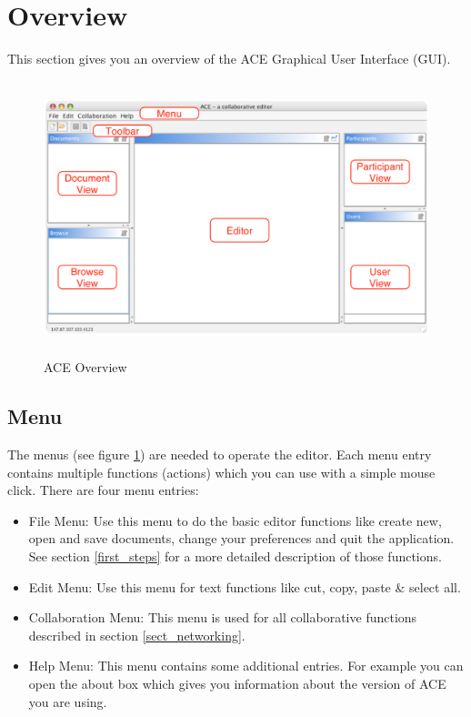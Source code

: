 \documentclass[11pt,a4paper]{article}
\begin{document}
\newpage
\section{Overview}
This section gives you an overview of the ACE Graphical User Interface (GUI). 

\begin{figure}[H]
\begin{center}
  \includegraphics[height=3.135in, width=5.01in]{../images/usermanual/g_ace_overview.eps}
\caption{ACE Overview}
\label{ace_overview}
\end{center}
\end{figure}

\subsection{Menu}
The menus (see figure \ref{ace_overview}) are needed to operate the editor. Each menu entry contains multiple functions (actions) which you can use with a simple mouse click. There are four menu entries:
\begin{itemize}
\item File Menu: Use this menu to do the basic editor functions like create new, open and save documents, change your preferences and quit the application. See section \ref{first_steps} for a more detailed description of those functions.
\item Edit Menu: Use this menu for text functions like cut, copy, paste \& select all.
\item Collaboration Menu: This menu is used for all collaborative functions described in section \ref{sect_networking}.
\item Help Menu: This menu contains some additional entries. For example you can open the about box which gives you information about the version of ACE you are using.
\end{itemize}
\end{document}
